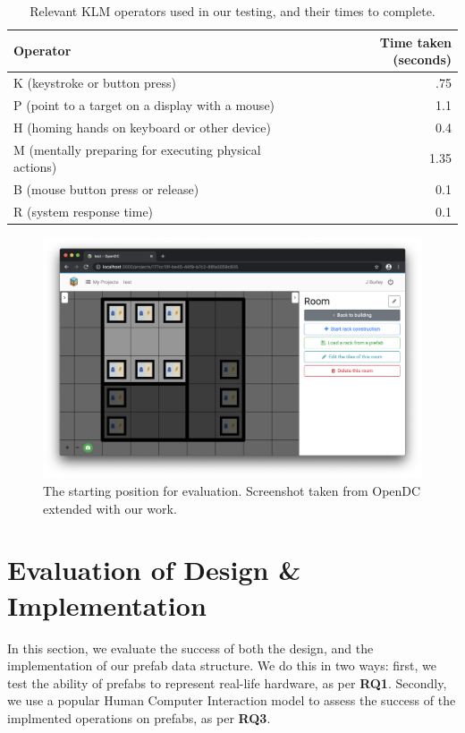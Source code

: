 \documentclass[11pt]{article}
\begin{document}
\begin{table}[]
\centering
	\begin{tabular}{lr}
	\toprule
	Operator                                              & Time taken (seconds) \\ \midrule
	K (keystroke or button press)                         & .75                  \\
	P (point to a target on a display with a mouse)       & 1.1                  \\
	H (homing hands on keyboard or other device)          & 0.4                  \\
	M (mentally preparing for executing physical actions) & 1.35                 \\
	B (mouse button press or release)                     & 0.1                  \\
	R (system response time)							  &	   0.1                  \\
	\bottomrule
	\end{tabular}
\caption[Relevant KLM operators used in our testing, and their times to complete]{Relevant KLM operators used in our testing, and their times to complete\cite{Newell1980}.}
\label{tab:3}
\end{table}


\begin{figure}[]
	\centering
	\includegraphics[width=\textwidth]{frontendstartingpoint.png}
	\caption[The starting position for evaluation]{The starting position for evaluation. Screenshot taken from OpenDC extended with our work.}
	\label{fig:evalstart}
\end{figure}

\section{Evaluation of Design \& Implementation} \label{sec:evaluation}
	In this section, we evaluate the success of both the design, and the implementation of our prefab data structure.
	We do this in two ways: first, we test the ability of prefabs to represent real-life hardware, as per \textbf{RQ1}.
	Secondly, we use a popular Human Computer Interaction model to assess the success of the implmented operations on prefabs, as per \textbf{RQ3}.
\end{document}
